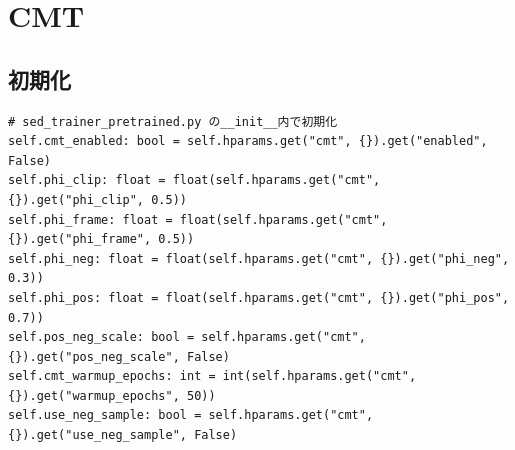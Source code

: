 \documentclass[../main.tex]{subfiles}
\begin{document}
\section{CMT}
\subsection{初期化}
\begin{verbatim}
# sed_trainer_pretrained.py の__init__内で初期化
self.cmt_enabled: bool = self.hparams.get("cmt", {}).get("enabled", False)
self.phi_clip: float = float(self.hparams.get("cmt", {}).get("phi_clip", 0.5))
self.phi_frame: float = float(self.hparams.get("cmt", {}).get("phi_frame", 0.5))
self.phi_neg: float = float(self.hparams.get("cmt", {}).get("phi_neg", 0.3))
self.phi_pos: float = float(self.hparams.get("cmt", {}).get("phi_pos", 0.7))
self.pos_neg_scale: bool = self.hparams.get("cmt", {}).get("pos_neg_scale", False)
self.cmt_warmup_epochs: int = int(self.hparams.get("cmt", {}).get("warmup_epochs", 50))
self.use_neg_sample: bool = self.hparams.get("cmt", {}).get("use_neg_sample", False)
\end{verbatim}
\end{document}
